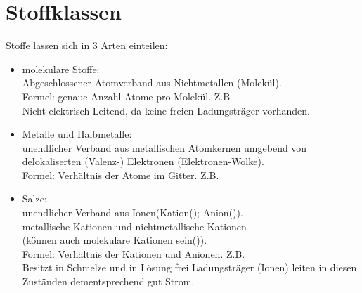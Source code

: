 \section{Stoffklassen}
    Stoffe lassen sich in 3 Arten einteilen:
    \begin{itemize}
        \item molekulare Stoffe:\\
        Abgeschlossener Atomverband aus Nichtmetallen (Molekül).\\Formel: genaue Anzahl Atome pro Molekül. Z.B \ce\\Nicht elektrisch Leitend, da keine freien Ladungsträger vorhanden.
        \item Metalle und Halbmetalle:\\
        unendlicher Verband aus metallischen Atomkernen umgebend von delokaliserten (Valenz-) Elektronen (Elektronen-Wolke).\\Formel: Verhältnis der Atome im Gitter. Z.B. 
        \item Salze:\\
        unendlicher Verband aus Ionen(Kation(\ce{+}); Anion(\ce{-})).\\ metallische Kationen und nichtmetallische Kationen\\(können auch molekulare Kationen sein()).\\Formel: Verhältnis der Kationen und Anionen. Z.B. \\Besitzt in Schmelze und in Lösung frei Ladungsträger (Ionen) leiten in diesen Zuständen dementsprechend gut Strom.
    \end{itemize}
